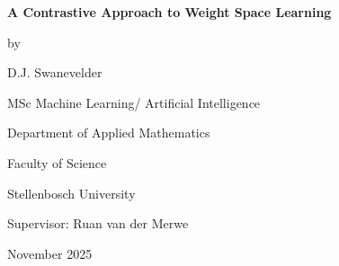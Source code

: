 \graphicspath{{frontmatter/fig/}}

\begin{titlepage}

	\begin{center}			
		\vfill
        \vfill
        \vfill
		{\bfseries \huge A Contrastive Approach to Weight Space Learning \par}
		\vfill
        {\large by \\[5pt]}
		{\Large {\Large D.J. Swanevelder} \par}
		\vfill
		\vfill

		{\large MSc Machine Learning/ Artificial Intelligence \par
		 Department of Applied Mathematics \par Faculty of Science \par Stellenbosch University \par}
		
		\vfill
		
		{\large {Supervisor}: Ruan van der Merwe}\par
		\vfill
		{\large November 2025}
        \vfill
	\end{center}
\end{titlepage}
